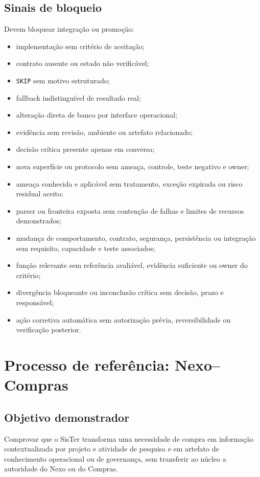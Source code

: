 \documentclass[11pt,a4paper,oneside]{article}
\begin{document}
\subsection{Sinais de bloqueio}
Devem bloquear integração ou promoção:
\begin{itemize}
  \item implementação sem critério de aceitação;
  \item contrato ausente ou estado não verificável;
  \item \texttt{SKIP} sem motivo estruturado;
  \item fallback indistinguível de resultado real;
  \item alteração direta de banco por interface operacional;
  \item evidência sem revisão, ambiente ou artefato relacionado;
  \item decisão crítica presente apenas em conversa;
  \item nova superfície ou protocolo sem ameaça, controle, teste negativo e owner;
  \item ameaça conhecida e aplicável sem tratamento, exceção expirada ou risco residual aceito;
  \item parser ou fronteira exposta sem contenção de falhas e limites de recursos demonstrados;
  \item mudança de comportamento, contrato, segurança, persistência ou integração sem requisito, capacidade e teste associados;
  \item função relevante sem referência avaliável, evidência suficiente ou owner do critério;
  \item divergência bloqueante ou inconclusão crítica sem decisão, prazo e responsável;
  \item ação corretiva automática sem autorização prévia, reversibilidade ou verificação posterior.
\end{itemize}

\section{Processo de referência: Nexo--Compras}

\subsection{Objetivo demonstrador}
Comprovar que o SisTer transforma uma necessidade de compra em informação contextualizada por projeto e atividade de pesquisa e em artefato de conhecimento operacional ou de governança, sem transferir ao núcleo a autoridade do Nexo ou do Compras.
\end{document}
